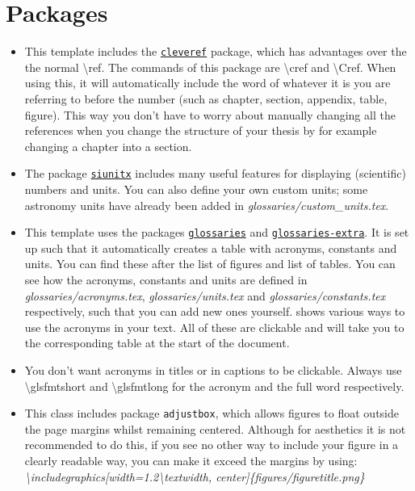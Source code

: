 \section{Packages}
\label{sec:tips_packages}
\begin{itemize}
     \item This template includes the \texttt{\href{https://ctan.org/pkg/cleveref}{cleveref}} package, which has advantages over the the normal \textbackslash ref. The commands of this package are \textbackslash cref and \textbackslash Cref. When using this, it will automatically include the word of whatever it is you are referring to before the number (such as chapter, section, appendix, table, figure). This way you don't have to worry about manually changing all the references when you change the structure of your thesis by for example changing a chapter into a section.
    \item The package \texttt{\href{https://ctan.org/pkg/siunitx}{siunitx}} includes many useful features for displaying (scientific) numbers and units. You can also define your own custom units; some astronomy units have already been added in \textit{glossaries/custom\_units.tex}.
    \item This template uses the packages \texttt{\href{https://ctan.org/pkg/glossaries}{glossaries}} and \texttt{\href{https://ctan.org/pkg/glossaries-extra}{glossaries-extra}}. It is set up such that it automatically creates a table with acronyms, constants and units. You can find these after the list of figures and list of tables. You can see how the acronyms, constants and units are defined in  \textit{glossaries/acronyms.tex}, \textit{glossaries/units.tex} and \textit{glossaries/constants.tex} respectively, such that you can add new ones yourself.  shows various ways to use the acronyms in your text. All of these are clickable and will take you to the corresponding table at the start of the document.
    \item You don't want acronyms in titles or in captions to be clickable. Always use \textbackslash glsfmtshort and \textbackslash glsfmtlong for the acronym and the full word respectively.
    \item This class includes package \texttt{adjustbox}, which allows figures to float outside the page margins whilst remaining centered. Although for aesthetics it is not recommended to do this, if you see no other way to include your figure in a clearly readable way, you can make it exceed the margins by using: \textit{\textbackslash includegraphics[width=1.2\textbackslash textwidth, center]\{figures/figuretitle.png\}}
\end{itemize}

